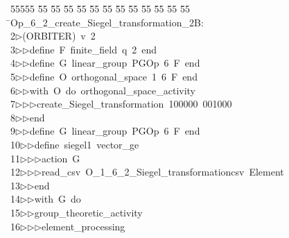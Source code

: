 %
%
\begin{tabbing}
55555 \= 55 \= 55 \= 55 \= 55 \= 55 \= 55 \= 55 \= 55 \= 55 \= 55 \= 55 \= 55 \= \>Op\_6\_2\_create\_Siegel\_transformation\_2B:\\[0pt]
2\>$\triangleright$\>(ORBITER)\ v\ 2\ \\[0pt]
3\>$\triangleright$\>$\triangleright$\>define\ F\ finite\_field\ q\ 2\ end\ \\[0pt]
4\>$\triangleright$\>$\triangleright$\>define\ G\ linear\_group\ PGOp\ 6\ F\ end\ \\[0pt]
5\>$\triangleright$\>$\triangleright$\>define\ O\ orthogonal\_space\ 1\ 6\ F\ end\ \\[0pt]
6\>$\triangleright$\>$\triangleright$\>with\ O\ do\ orthogonal\_space\_activity\ \\[0pt]
7\>$\triangleright$\>$\triangleright$\>$\triangleright$\>create\_Siegel\_transformation\ 100000\ 001000\ \\[0pt]
8\>$\triangleright$\>$\triangleright$\>end\ \\[0pt]
9\>$\triangleright$\>$\triangleright$\>define\ G\ linear\_group\ PGOp\ 6\ F\ end\ \\[0pt]
10\>$\triangleright$\>$\triangleright$\>define\ siegel1\ vector\_ge\ \\[0pt]
11\>$\triangleright$\>$\triangleright$\>$\triangleright$\>action\ G\ \\[0pt]
12\>$\triangleright$\>$\triangleright$\>$\triangleright$\>read\_csv\ O\_1\_6\_2\_Siegel\_transformationcsv\ Element\ \\[0pt]
13\>$\triangleright$\>$\triangleright$\>end\ \\[0pt]
14\>$\triangleright$\>$\triangleright$\>with\ G\ do\ \\[0pt]
15\>$\triangleright$\>$\triangleright$\>group\_theoretic\_activity\ \\[0pt]
16\>$\triangleright$\>$\triangleright$\>$\triangleright$\>element\_processing\ \\[0pt]

\end{tabbing}
